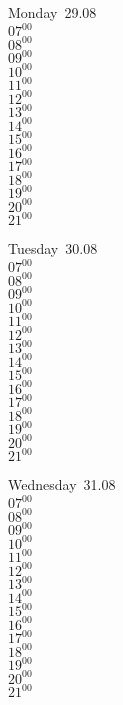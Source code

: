 \documentclass[11pt,a4paper]{book}\usepackage[]{graphicx}\usepackage[]{color}
\begin{document}
\begin{headerbox}
\end{headerbox}
\begin{weekdaybox}
  Monday~29.08\\
  { 
  \vfill
  $07^{00}$\\
$08^{00}$\\
$09^{00}$\\
$10^{00}$\\
$11^{00}$\\
$12^{00}$\\
$13^{00}$\\
$14^{00}$\\
$15^{00}$\\
$16^{00}$\\
$17^{00}$\\
$18^{00}$\\
$19^{00}$\\
$20^{00}$\\
$21^{00}$\\
  }
\end{weekdaybox}
\begin{weekdaybox}
  Tuesday~30.08\\
  { 
  \vfill
  $07^{00}$\\
$08^{00}$\\
$09^{00}$\\
$10^{00}$\\
$11^{00}$\\
$12^{00}$\\
$13^{00}$\\
$14^{00}$\\
$15^{00}$\\
$16^{00}$\\
$17^{00}$\\
$18^{00}$\\
$19^{00}$\\
$20^{00}$\\
$21^{00}$\\
  }
\end{weekdaybox}
\begin{weekdaybox}
  Wednesday~31.08\\
  { 
  \vfill
  $07^{00}$\\
$08^{00}$\\
$09^{00}$\\
$10^{00}$\\
$11^{00}$\\
$12^{00}$\\
$13^{00}$\\
$14^{00}$\\
$15^{00}$\\
$16^{00}$\\
$17^{00}$\\
$18^{00}$\\
$19^{00}$\\
$20^{00}$\\
$21^{00}$\\
  }
\end{weekdaybox}
\end{document}
